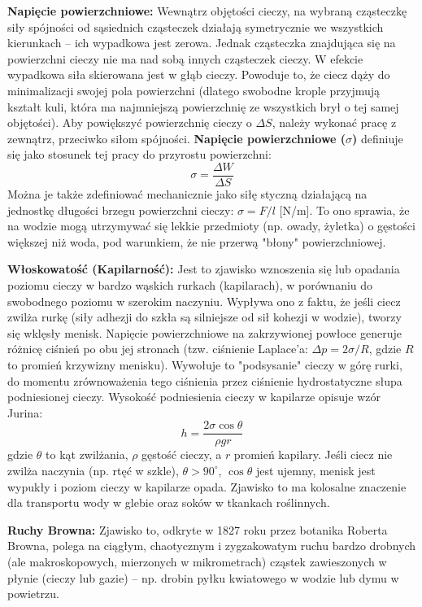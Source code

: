 \documentclass[11pt, a4paper]{article}
\begin{document}
\textbf{Napięcie powierzchniowe:}
Wewnątrz objętości cieczy, na wybraną cząsteczkę siły spójności od sąsiednich cząsteczek działają symetrycznie we wszystkich kierunkach – ich wypadkowa jest zerowa. Jednak cząsteczka znajdująca się na powierzchni cieczy nie ma nad sobą innych cząsteczek cieczy. W efekcie wypadkowa siła skierowana jest w głąb cieczy. Powoduje to, że ciecz dąży do minimalizacji swojej pola powierzchni (dlatego swobodne krople przyjmują kształt kuli, która ma najmniejszą powierzchnię ze wszystkich brył o tej samej objętości).
Aby powiększyć powierzchnię cieczy o $\Delta S$, należy wykonać pracę z zewnątrz, przeciwko siłom spójności. \textbf{Napięcie powierzchniowe ($\sigma$)} definiuje się jako stosunek tej pracy do przyrostu powierzchni:
\[
\sigma = \frac{\Delta W}{\Delta S}
\]
Można je także zdefiniować mechanicznie jako siłę styczną działającą na jednostkę długości brzegu powierzchni cieczy: $\sigma = F/l$ [N/m]. To ono sprawia, że na wodzie mogą utrzymywać się lekkie przedmioty (np. owady, żyletka) o gęstości większej niż woda, pod warunkiem, że nie przerwą "błony" powierzchniowej.

\textbf{Włoskowatość (Kapilarność):}
Jest to zjawisko wznoszenia się lub opadania poziomu cieczy w bardzo wąskich rurkach (kapilarach), w porównaniu do swobodnego poziomu w szerokim naczyniu. Wypływa ono z faktu, że jeśli ciecz zwilża rurkę (siły adhezji do szkła są silniejsze od sił kohezji w wodzie), tworzy się wklęsły menisk. Napięcie powierzchniowe na zakrzywionej powłoce generuje różnicę ciśnień po obu jej stronach (tzw. ciśnienie Laplace'a: $\Delta p = 2\sigma / R$, gdzie $R$ to promień krzywizny menisku). 
Wywołuje to "podsysanie" cieczy w górę rurki, do momentu zrównoważenia tego ciśnienia przez ciśnienie hydrostatyczne słupa podniesionej cieczy. Wysokość podniesienia cieczy w kapilarze opisuje wzór Jurina:
\[
h = \frac{2\sigma \cos\theta}{\rho g r}
\]
gdzie $\theta$ to kąt zwilżania, $\rho$ gęstość cieczy, a $r$ promień kapilary. Jeśli ciecz nie zwilża naczynia (np. rtęć w szkle), $\theta > 90^\circ$, $\cos\theta$ jest ujemny, menisk jest wypukły i poziom cieczy w kapilarze opada. Zjawisko to ma kolosalne znaczenie dla transportu wody w glebie oraz soków w tkankach roślinnych.

\textbf{Ruchy Browna:}
Zjawisko to, odkryte w 1827 roku przez botanika Roberta Browna, polega na ciągłym, chaotycznym i zygzakowatym ruchu bardzo drobnych (ale makroskopowych, mierzonych w mikrometrach) cząstek zawieszonych w płynie (cieczy lub gazie) – np. drobin pyłku kwiatowego w wodzie lub dymu w powietrzu. 
\end{document}
